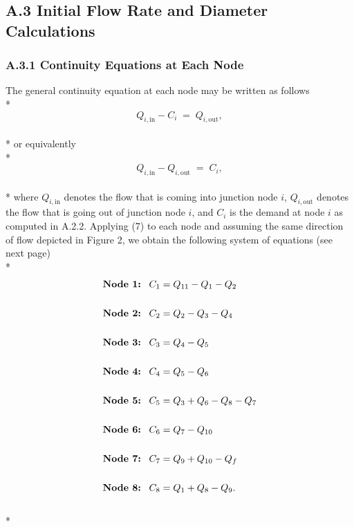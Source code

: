 \documentclass[]{article}
\begin{document}
\subsection{A.3 Initial Flow Rate and Diameter Calculations}
\subsubsection{A.3.1 Continuity Equations at Each Node}
The general continuity equation at each node may be written as follows \\* 
\begin{equation}
\nonumber
Q_{i,\text{in}} - C_i \; = \; Q_{i,\text{out}},
\end{equation} \\* 
or equivalently \\* 
\begin{equation}
Q_{i,\text{in}} -  Q_{i,\text{out}} \; = \; C_i,
\end{equation} \\* 
where $Q_{i,\text{in}}$ denotes the flow that is coming into junction node $i$, $Q_{i,\text{out}}$ denotes the flow that is going out of junction node $i$, and $C_i$ is the demand at node $i$ as computed in A.2.2. Applying (7) to each node and assuming the same direction of flow depicted in Figure 2, we obtain the following system of equations (see next page) \\*
\begin{align}
\nonumber
\text{\textbf{Node 1:}} \; \; \; C_1 &= Q_{11} -Q_{1} - Q_2 \\ \nonumber \\ \nonumber 
\text{\textbf{Node 2:}} \; \; \; C_2 &= Q_2-Q_3-Q_4  \\ \nonumber \\\nonumber 
\text{\textbf{Node 3:}} \; \; \; C_3 &= Q_4-Q_5 \\ \nonumber \\\nonumber 
\text{\textbf{Node 4:}} \; \; \; C_4 &= Q_5-Q_6  \\ \nonumber \\\nonumber 
\text{\textbf{Node 5:}} \; \; \; C_5 &= Q_3+Q_6-Q_8-Q_7  \\ \nonumber \\\nonumber 
\text{\textbf{Node 6:}} \; \; \; C_6 &= Q_7-Q_{10} \\ \nonumber \\\nonumber 
\text{\textbf{Node 7:}} \; \; \; C_7 &= Q_9+Q_{10} - Q_f \\ \nonumber \\\nonumber 
\text{\textbf{Node 8:}} \; \; \; C_8 &= Q_1+Q_8-Q_9.
\end{align} \\* 
\end{document}
